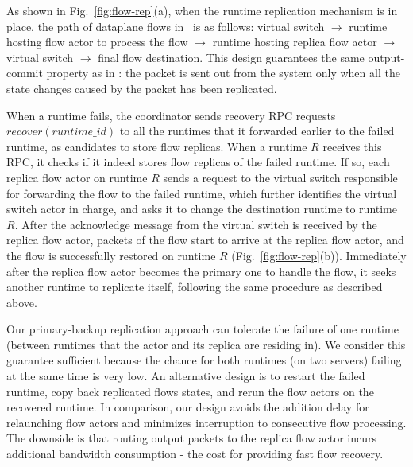 As shown in Fig.~\ref{fig:flow-rep}(a), when the runtime replication mechanism is in place, the path of dataplane flows in \nfactor~is as follows: virtual switch $\rightarrow$ runtime hosting flow actor to process the flow $\rightarrow$ runtime hosting replica flow actor $\rightarrow$ virtual switch $\rightarrow$ final flow destination. This design guarantees the same output-commit property as in \cite{sherry2015rollback}: the packet is sent out from the system only when all the state changes caused by the packet has been replicated. %



When a runtime fails, the coordinator sends recovery RPC requests $recover(runtime\_id) $ to all the runtimes that it forwarded earlier to the failed runtime, as candidates to store flow replicas. When a runtime $R$ receives this RPC, it checks if it indeed stores flow replicas of the failed runtime. If so, each replica flow actor on runtime $R$ sends a request to the virtual switch responsible for forwarding the flow to the failed runtime, which further identifies the virtual switch actor in charge, and asks it to change the destination runtime to runtime $R$. After the acknowledge message from the virtual switch is received by the replica flow actor, packets of the flow start to arrive at the replica flow actor, and the flow is successfully restored on runtime $R$ (Fig.~\ref{fig:flow-rep}(b)). Immediately after the replica flow actor becomes the primary one to handle the flow, it seeks another runtime to replicate itself, following the same procedure as described above.


Our primary-backup replication approach can tolerate the failure of one runtime (between runtimes that the actor and its replica are residing in). We consider this guarantee sufficient because the
chance for both runtimes (on two servers) failing at the same time is very low. An alternative design is to restart the failed runtime, copy back replicated flows states, and rerun the flow actors on the recovered runtime. In comparison, our design avoids the addition delay for relaunching flow actors and minimizes interruption to consecutive flow processing. %
 The downside is that routing output packets to the replica flow actor incurs additional bandwidth consumption -  the cost for providing fast flow recovery. %


